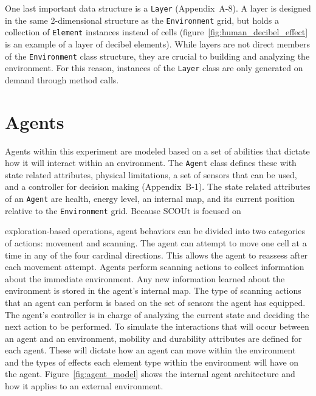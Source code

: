 One last important data structure is a \texttt{Layer} (Appendix~A-8).
A layer is designed in the same 2-dimensional structure as the \texttt{Environment} grid, but holds a collection of \texttt{Element} instances instead of cells (figure~\ref{fig:human_decibel_effect} is an example of a layer of decibel elements).
While layers are not direct members of the \texttt{Environment} class structure, they are crucial to building and analyzing the environment.
For this reason, instances of the \texttt{Layer} class are only generated on demand through method calls.


\section{Agents} \label{sec:agent}
Agents within this experiment are modeled based on a set of abilities that dictate how it will interact within an environment.
The \texttt{Agent} class defines these with state related attributes, physical limitations, a set of sensors that can be used, and a controller for decision making (Appendix~B-1).
The state related attributes of an \texttt{Agent} are health, energy level, an internal map, and its current position relative to the \texttt{Environment} grid.
Because SCOUt is focused on

\noindent
exploration-based operations, agent behaviors can be divided into two categories of actions: movement and scanning.
The agent can attempt to move one cell at a time in any of the four cardinal directions.
This allows the agent to reassess after each movement attempt.
Agents perform scanning actions to collect information about the immediate environment.
Any new information learned about the environment is stored in the agent's internal map.
The type of scanning actions that an agent can perform is based on the set of sensors the agent has equipped.
The agent's controller is in charge of analyzing the current state and deciding the next action to be performed.
To simulate the interactions that will occur between an agent and an environment, mobility and durability attributes are defined for each agent.
These will dictate how an agent can move within the environment and the types of effects each element type within the environment will have on the agent.
Figure~\ref{fig:agent_model} shows the internal agent architecture and how it applies to an external environment.


